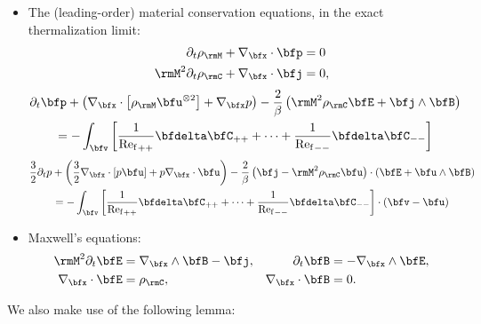 \begin{enumerate}
\begin{itemize}
            \item  The (leading-order) material conservation equations, in the exact thermalization limit:
            \begin{align}
                \partial_{t}\rho_{\rmM} + \nabla_{\bfx}\cdot\bfp  &=  0  \label{eqn:mass conservation}  \\
                \rmM^{2}\partial_{t}\rho_{\rmC} + \nabla_{\bfx}\cdot\bfj  &=  0,
            \end{align}
            \vspace{-25pt}
            \begin{multline}
                \partial_{t}\bfp + \left(\nabla_{\bfx}\cdot\left[\rho_{\rmM}\bfu^{\otimes 2}\right] + \nabla_{\bfx}p\right) - \frac{2}{\beta}\left(\rmM^{2}\rho_{\rmC}\bfE + \bfj\wedge\bfB\right)  \\
                =  - \int_{\bfv}\left[\frac{1}{{\rmRef}_{++}}\bfdelta\bfC_{++} + \cdots + \frac{1}{{\rmRef}_{--}}\bfdelta\bfC_{--}\right]
            \end{multline}
            \vspace{-15pt}
            \begin{multline}
                \frac{3}{2}\partial_{t}p + \left(\frac{3}{2}\nabla_{\bfx}\cdot[p\bfu] + p\nabla_{\bfx}\cdot\bfu\right) - \frac{2}{\beta}\left(\bfj - \rmM^{2}\rho_{\rmC}\bfu\right)\cdot(\bfE + \bfu\wedge\bfB)  \\
                =  - \int_{\bfv}\left[\frac{1}{{\rmRef}_{++}}\bfdelta\bfC_{++} + \cdots + \frac{1}{{\rmRef}_{--}}\bfdelta\bfC_{--}\right]\cdot(\bfv - \bfu)  \label{eqn:energy conservation}
            \end{multline}

            \item  Maxwell's equations:
            \begin{align}
                \rmM^{2}\partial_{t}\bfE  &=  \nabla_{\bfx}\wedge\bfB - \bfj,  &
                        \partial_{t}\bfB  &=  - \nabla_{\bfx}\wedge\bfE,  \label{eqn:Maxwell's equations transient}  \\
                  \nabla_{\bfx}\cdot\bfE  &=  \rho_{\rmC},  &
                  \nabla_{\bfx}\cdot\bfB  &=  0.  \label{eqn:Maxwell's equations steady-state}
            \end{align}
        \end{itemize}
    \end{enumerate}
    We also make use of the following lemma:
